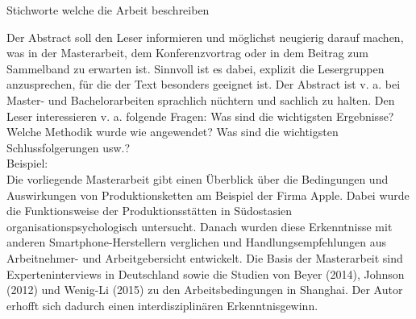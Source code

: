 \thispagestyle{empty}

Stichworte welche die Arbeit beschreiben

Der Abstract soll den Leser informieren und möglichst neugierig darauf machen, was in der Masterarbeit, dem Konferenzvortrag oder in dem Beitrag zum Sammelband zu erwarten ist. Sinnvoll ist es dabei, explizit die Lesergruppen anzusprechen, für die der Text besonders geeignet ist. Der Abstract ist v. a. bei Master- und Bachelorarbeiten sprachlich nüchtern und sachlich zu halten. Den Leser interessieren v. a. folgende Fragen: Was sind die wichtigsten Ergebnisse? Welche Methodik wurde wie angewendet? Was sind die wichtigsten Schlussfolgerungen usw.?\\

Beispiel:\\
Die vorliegende Masterarbeit gibt einen Überblick über die Bedingungen und Auswirkungen von Produktionsketten am Beispiel der Firma Apple. Dabei wurde die Funktionsweise der Produktionsstätten in Südostasien organisationspsychologisch untersucht. Danach wurden diese Erkenntnisse mit anderen Smartphone-Herstellern verglichen und Handlungsempfehlungen aus Arbeitnehmer- und Arbeitgebersicht entwickelt. Die Basis der Masterarbeit sind Experteninterviews in Deutschland sowie die Studien von Beyer (2014), Johnson (2012) und Wenig-Li (2015) zu den Arbeitsbedingungen in Shanghai. Der Autor erhofft sich dadurch einen interdisziplinären Erkenntnisgewinn.

